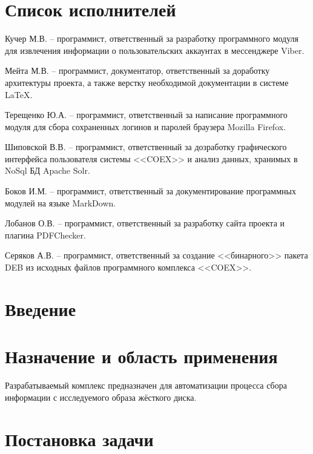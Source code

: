 


 
 
 
 \newpage
 \section*{Список исполнителей}
 
Кучер М.В. -- программист, ответственный за разработку программного модуля для извлечения информации о пользовательских аккаунтах в мессенджере Viber.

Мейта М.В. -- программист, документатор, ответственный за доработку архитектуры проекта, а также верстку необходимой документации в системе \LaTeX.

Терещенко Ю.А. -- программист, ответственный за написание программного модуля для сбора сохраненных логинов и паролей браузера Mozilla Firefox.

Шиповской В.В. -- программист, ответственный за дозработку графического интерфейса пользователя системы <<COEX>> и анализ данных, хранимых в NoSql БД Apache Solr.

Боков И.М. -- программист, ответственный за документирование программных модулей на языке MarkDown.

Лобанов О.В. -- программист, ответственный за разработку сайта проекта и плагина PDFChecker. 

Серяков А.В. -- программист, ответственный за создание <<бинарного>> пакета DEB из исходных файлов программного комплекса <<COEX>>.



 \newpage
 \tableofcontents

 \newpage
 \section*{Введение}
 

 \section{Назначение и область применения}
Разрабатываемый комплекс предназначен для автоматизации процесса сбора информации с исследуемого образа жёсткого диска.

\section{Постановка задачи}
\setcounter{figure}{0}


